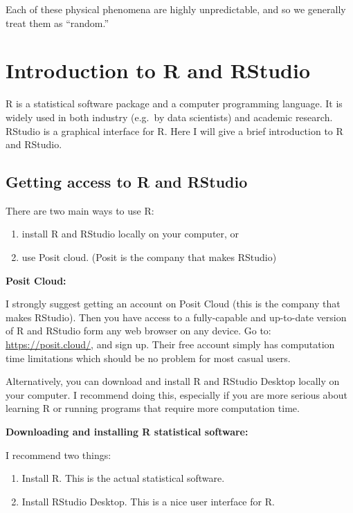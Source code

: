 \documentclass[
]{article}
\begin{document}
Each of these physical phenomena are highly unpredictable, and so we generally treat them as ``random.''

\hypertarget{introduction-to-r-and-rstudio}{%
\section{Introduction to R and RStudio}\label{introduction-to-r-and-rstudio}}

R is a statistical software package and a computer programming language.
It is widely used in both industry (e.g.~by data scientists) and academic research.
RStudio is a graphical interface for R.
Here I will give a brief introduction to R and RStudio.

\hypertarget{getting-access-to-r-and-rstudio}{%
\subsection{Getting access to R and RStudio}\label{getting-access-to-r-and-rstudio}}

There are two main ways to use R:

\begin{enumerate}
\def\labelenumi{(\arabic{enumi})}
\item
  install R and RStudio locally on your computer, or
\item
  use Posit cloud. (Posit is the company that makes RStudio)
\end{enumerate}

\textbf{Posit Cloud:}

I strongly suggest getting an account on Posit Cloud (this is the company that makes RStudio).
Then you have access to a fully-capable and up-to-date version of R and RStudio form any web browser on any device.
Go to: \url{https://posit.cloud/}, and sign up.
Their free account simply has computation time limitations which should be no problem for most casual users.

Alternatively, you can download and install R and RStudio Desktop locally on your computer.
I recommend doing this, especially if you are more serious about learning R or running programs that require more computation time.

\textbf{Downloading and installing R statistical software:}

I recommend two things:

\begin{enumerate}
\def\labelenumi{(\arabic{enumi})}
\item
  Install R. This is the actual statistical software.
\item
  Install RStudio Desktop. This is a nice user interface for R.
\end{enumerate}
\end{document}
